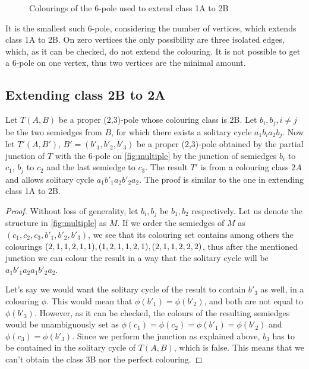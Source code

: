 \begin{figure}[h]
	\centering
	\begin{subfigure}{0.49\textwidth}
		\centering
		
	\end{subfigure}
	\hfill
	\begin{subfigure}{0.49\textwidth}
		\centering
		
	\end{subfigure}
	\caption{Colourings of the 6-pole used to extend class 1A to 2B}
	\label{fig:1A2BCol}
\end{figure}

It is the smallest such 6-pole, considering the number of vertices, which extends class 1A to 2B. On zero vertices the only possibility are three isolated edges, which, as it can be checked, do not extend the colouring. It is not possible to get a 6-pole on one vertex, thus two vertices are the minimal amount.

\subsection{Extending class 2B to 2A}

Let $T(A,B)$ be a proper (2,3)-pole whose colouring class is 2B. Let $b_i,b_j,i\neq j$ be the two semiedges from $B$, for which there exists a solitary cycle $a_1b_ia_2b_j$. Now let $T'(A,B')$, $B'=(b'_1, b'_2, b'_3)$ be a proper (2,3)-pole obtained by the partial junction of $T$ with the 6-pole on \cref{fig:multiple} by the junction of semiedges $b_i$ to $c_1$, $b_j$ to $c_2$ and the last semiedge to $c_3$. The result $T'$ is from a colouring class $2A$ and allows solitary cycle $a_1b'_1a_2b'_2a_2$. The proof is similar to the one in extending class 1A to 2B.

\begin{proof}
	Without loss of generality, let $b_i,b_j$ be $b_1,b_2$ respectively. Let us denote the structure in  \cref{fig:multiple} as $M$. If we order the semiedges of $M$ as $(c_1,c_2,c_3,b'_1,b'_2,b'_3)$, we see that its colouring set contains among others the colourings $(2,1,1,2,1,1), (1,2,1,1,2,1), \newline (2,1,1,2,2,2)$, thus after the mentioned junction we can colour the result in a way that the solitary cycle will be $a_1b'_1a_2a_1b'_2a_2$.
	
	Let's say we would want the solitary cycle of the result to contain $b'_3$ as well, in a colouring $\phi$. This would mean that $\phi(b'_1)=\phi(b'_2)$, and both are not equal to $\phi(b'_3)$. However, as it can be checked, the colours of the resulting semiedges would be unambiguously set as $\phi(c_1)=\phi(c_2)=\phi(b'_1)=\phi(b'_2)$ and $\phi(c_3)=\phi(b'_3)$. Since we perform the junction as explained above, $b_3$ has to be contained in the solitary cycle of $T(A,B)$, which is false. This means that we can't obtain the class 3B nor the perfect colouring.
\end{proof}

